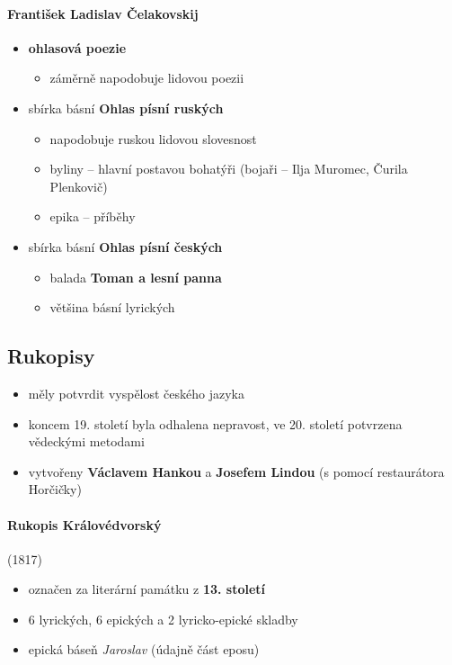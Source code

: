 \paragraph{František Ladislav Čelakovskij}
\begin{itemize}
\item \textbf{ohlasová poezie}
	\begin{itemize}
	\item záměrně napodobuje lidovou poezii
	\end{itemize}
\item sbírka básní \textbf{Ohlas písní ruských}
	\begin{itemize}
	\item napodobuje ruskou lidovou slovesnost
	\item byliny -- hlavní postavou bohatýři (bojaři -- Ilja Muromec, Čurila Plenkovič)
	\item epika -- příběhy
	\end{itemize}
\item sbírka básní \textbf{Ohlas písní českých}
	\begin{itemize}
	\item balada \textbf{Toman a lesní panna}
	\item většina básní lyrických
	\end{itemize}
\end{itemize}

\subsection{Rukopisy}
\begin{itemize}
\item měly potvrdit vyspělost českého jazyka
\item koncem 19. století byla odhalena nepravost, ve 20. století potvrzena vědeckými metodami
\item vytvořeny \textbf{Václavem Hankou} a \textbf{Josefem Lindou} (s pomocí restaurátora Horčičky)
\end{itemize}

\paragraph{Rukopis Královédvorský} (1817)
\begin{itemize}
\item označen za literární památku z \textbf{13. století}
\item 6 lyrických, 6 epických a 2 lyricko-epické skladby
\item epická báseň \textit{Jaroslav} (údajně část eposu)
\end{itemize}

